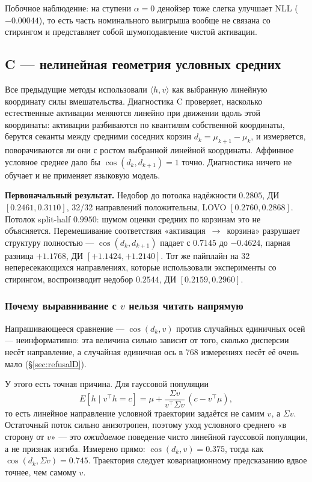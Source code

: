 \documentclass[10pt,a4paper]{article}
\begin{document}
Побочное наблюдение: на ступени $\alpha = 0$ денойзер тоже слегка улучшает NLL
($-0.00044$), то есть часть номинального выигрыша вообще не связана со стирингом
и представляет собой шумоподавление чистой активации.

\subsection{C — нелинейная геометрия условных средних}\label{sec:curvature}

Все предыдущие методы использовали $\langle h, v\rangle$ как выбранную линейную
координату силы вмешательства. Диагностика C проверяет, насколько естественные
активации меняются линейно при движении вдоль этой координаты: активации
разбиваются по
квантилям собственной координаты, берутся секанты между средними соседних
корзин $d_k = \mu_{k+1} - \mu_k$, и измеряется, поворачиваются ли они с ростом
выбранной линейной координаты. Аффинное условное среднее дало бы
$\cos(d_k, d_{k+1}) = 1$ точно. Диагностика ничего не обучает и не применяет
языковую модель.

\textbf{Первоначальный результат.} Недобор до потолка надёжности $0.2805$,
ДИ $[0.2461, 0.3110]$, 32/32 направлений положительны, LOVO $[0.2760, 0.2868]$.
Потолок split-half $0.9950$: шумом оценки средних по корзинам это не
объясняется. Перемешивание соответствия «активация~$\to$~корзина» разрушает
структуру полностью — $\cos(d_k, d_{k+1})$ падает с $0.7145$ до $-0.4624$, парная
разница $+1.1768$, ДИ $[+1.1424, +1.2140]$. Тот же пайплайн на 32
непересекающихся направлениях, которые использовали эксперименты со стирингом,
воспроизводит недобор $0.2544$, ДИ $[0.2159, 0.2960]$.

\subsubsection*{Почему выравнивание с $v$ нельзя читать напрямую}

Напрашивающееся сравнение — $\cos(d_k, v)$ против случайных единичных осей —
неинформативно: эта величина сильно зависит от того, сколько дисперсии несёт
направление, а случайная единичная ось в 768 измерениях несёт её очень мало
(\S\ref{sec:refusalD}).

У этого есть точная причина. Для гауссовой популяции
\[
  E[h \mid v^\top h = c]
  = \mu + \frac{\Sigma v}{v^\top \Sigma v}\,(c - v^\top\mu),
\]
то есть линейное направление условной траектории задаётся не самим $v$, а
$\Sigma v$. Остаточный поток сильно анизотропен, поэтому уход условного среднего
«в сторону от $v$» — это \emph{ожидаемое} поведение чисто линейной гауссовой
популяции, а не признак изгиба. Измерено прямо: $\cos(d_k, v) = 0.375$, тогда как
$\cos(d_k, \Sigma v) = \mathbf{0.745}$. Траектория следует ковариационному
предсказанию вдвое точнее, чем самому $v$.
\end{document}
